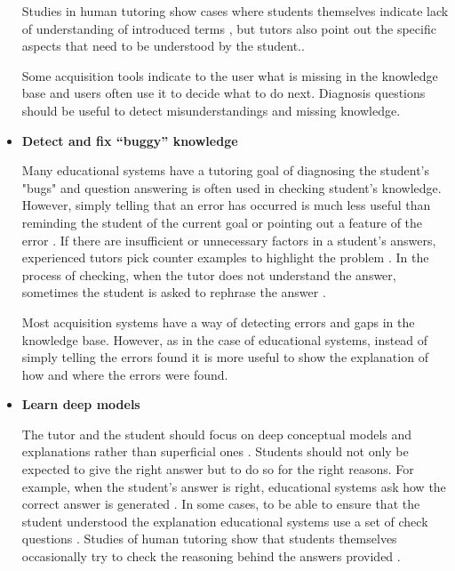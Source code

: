 \documentclass{llncs}
\begin{document}
\begin{itemize}
Studies in human tutoring show cases where students themselves indicate lack
of understanding of introduced terms \cite{Fox93}, but tutors also point out
the specific aspects that need to be understood by the
student.\cite{Collins82}.

\vspace*{0.5em}
Some acquisition tools indicate to the user what is missing in the knowledge
base \cite{KimG00} and users 
often use it to decide what to do next. 
Diagnosis questions should be useful to detect misunderstandings and missing
knowledge. 

 
\vspace*{0.5em}
\item {\bf Detect and fix ``buggy'' knowledge}

Many educational systems have a tutoring goal of diagnosing the student's
"bugs" \cite{woolf84,why77,buggy78} and question answering is often used in
checking student's knowledge.  However, simply telling that an error has
occurred is much less useful than reminding the student of the current goal or
pointing out a feature of the error \cite{McKendree90}.  If there are
insufficient or unnecessary factors in a student's answers, experienced tutors
pick counter examples to highlight the problem \cite{Collins82}. In the
process of checking, when the tutor does not understand the answer, sometimes
the student is asked to rephrase the answer \cite{Carbonell70}.


\vspace*{0.5em}
Most acquisition systems have a way of detecting errors and gaps in the
knowledge base.  However, as in the case of educational systems, instead of
simply telling the errors found it is more useful to show the explanation of
how and where the errors were found.


\vspace*{0.5em}
\item {\bf Learn deep models}

The tutor and the student should focus on deep conceptual models and
explanations rather than superficial ones \cite{VanLehn00}.  Students should
not only be expected to give the right answer but to do so for the right
reasons.  For example, when the student's answer is right, educational systems
ask how the correct answer is generated \cite{Aleven00,VanLehn00}.  In some
cases, to be able to ensure that the student understood the explanation
educational systems use a set of check questions \cite{Rose01}.  Studies of
human tutoring show that students themselves occasionally try to check the
reasoning behind the answers provided \cite{Fox93}.


\end{itemize}
\end{document}
